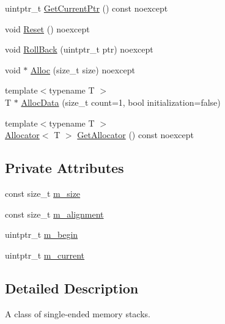 \begin{DoxyCompactItemize}
\item 
uintptr\+\_\+t \mbox{\hyperlink{classmage_1_1_single_ended_memory_stack_a11b792ad420eac8e620c568e89a88cef}{Get\+Current\+Ptr}} () const noexcept
\item 
void \mbox{\hyperlink{classmage_1_1_single_ended_memory_stack_abd43ab7bd76655265123b934ea2bc7a7}{Reset}} () noexcept
\item 
void \mbox{\hyperlink{classmage_1_1_single_ended_memory_stack_afa1fcaa95a61995234759f9c57723202}{Roll\+Back}} (uintptr\+\_\+t ptr) noexcept
\item 
void $\ast$ \mbox{\hyperlink{classmage_1_1_single_ended_memory_stack_acda0b7f2e61bf8ba8bbb9ba633237866}{Alloc}} (size\+\_\+t size) noexcept
\item 
{\footnotesize template$<$typename T $>$ }\\T $\ast$ \mbox{\hyperlink{classmage_1_1_single_ended_memory_stack_a65faeb76a286738ab119768423b513b3}{Alloc\+Data}} (size\+\_\+t count=1, bool initialization=false)
\item 
{\footnotesize template$<$typename T $>$ }\\\mbox{\hyperlink{classmage_1_1_single_ended_memory_stack_1_1_allocator}{Allocator}}$<$ T $>$ \mbox{\hyperlink{classmage_1_1_single_ended_memory_stack_a0f6be7c59dca442ac5924fadf52c126a}{Get\+Allocator}} () const noexcept
\end{DoxyCompactItemize}
\subsection*{Private Attributes}
\begin{DoxyCompactItemize}
\item 
const size\+\_\+t \mbox{\hyperlink{classmage_1_1_single_ended_memory_stack_a3766c742087068479c3e324280ca94bf}{m\+\_\+size}}
\item 
const size\+\_\+t \mbox{\hyperlink{classmage_1_1_single_ended_memory_stack_aeb5bc5af575eaeb5a0f08669a717cd28}{m\+\_\+alignment}}
\item 
uintptr\+\_\+t \mbox{\hyperlink{classmage_1_1_single_ended_memory_stack_a859a80ab120c14e3ebf4a310d5263507}{m\+\_\+begin}}
\item 
uintptr\+\_\+t \mbox{\hyperlink{classmage_1_1_single_ended_memory_stack_a78785ecceac6ce271658864dac80e84b}{m\+\_\+current}}
\end{DoxyCompactItemize}


\subsection{Detailed Description}
A class of single-\/ended memory stacks. 

